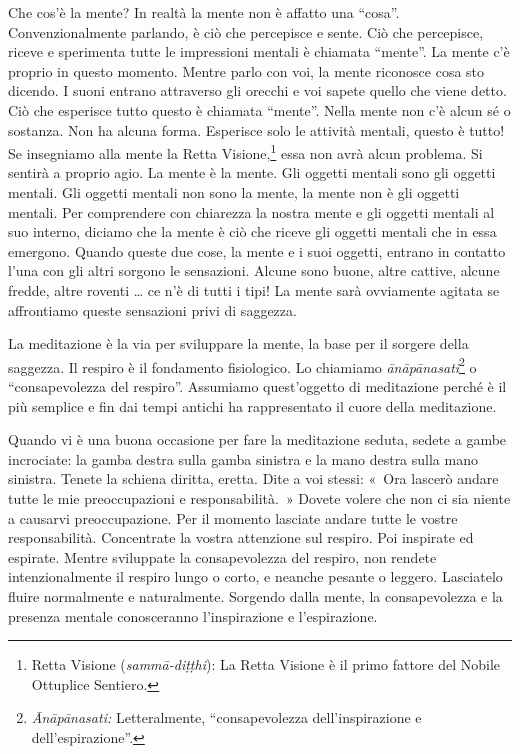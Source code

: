 Che cos'è la mente? In realtà la mente non è affatto una ``cosa''.
Convenzionalmente parlando, è ciò che percepisce e sente. Ciò che
percepisce, riceve e sperimenta tutte le impressioni mentali è chiamata
``mente''. La mente c'è proprio in questo momento. Mentre parlo con voi,
la mente riconosce cosa sto dicendo. I suoni entrano attraverso gli
orecchi e voi sapete quello che viene detto. Ciò che esperisce tutto
questo è chiamata ``mente''. Nella mente non c'è alcun sé o sostanza.
Non ha alcuna forma. Esperisce solo le attività mentali, questo è tutto!
Se insegniamo alla mente la Retta Visione,\footnote{Retta Visione
  (\emph{sammā-diṭṭhi}): La Retta Visione è il primo fattore del Nobile
  Ottuplice Sentiero.} essa non avrà alcun problema. Si sentirà a
proprio agio. La mente è la mente. Gli oggetti mentali sono gli oggetti
mentali. Gli oggetti mentali non sono la mente, la mente non è gli
oggetti mentali. Per comprendere con chiarezza la nostra mente e gli
oggetti mentali al suo interno, diciamo che la mente è ciò che riceve
gli oggetti mentali che in essa emergono. Quando queste due cose, la
mente e i suoi oggetti, entrano in contatto l'una con gli altri sorgono
le sensazioni. Alcune sono buone, altre cattive, alcune fredde, altre
roventi \ldots{} ce n'è di tutti i tipi! La mente sarà ovviamente agitata se
affrontiamo queste sensazioni privi di saggezza.

La meditazione è la via per sviluppare la mente, la base per il sorgere
della saggezza. Il respiro è il fondamento fisiologico. Lo chiamiamo
\emph{ānāpānasati}\footnote{\emph{Ānāpānasati:} Letteralmente,
  ``consapevolezza dell'inspirazione e dell'espirazione''.} o
``consapevolezza del respiro''. Assumiamo quest'oggetto di meditazione
perché è il più semplice e fin dai tempi antichi ha rappresentato il
cuore della meditazione.

Quando vi è una buona occasione per fare la meditazione seduta, sedete a
gambe incrociate: la gamba destra sulla gamba sinistra e la mano destra
sulla mano sinistra. Tenete la schiena diritta, eretta. Dite a voi
stessi: «~Ora lascerò andare tutte le mie preoccupazioni e
responsabilità.~» Dovete volere che non ci sia niente a causarvi
preoccupazione. Per il momento lasciate andare tutte le vostre
responsabilità. Concentrate la vostra attenzione sul respiro. Poi
inspirate ed espirate. Mentre sviluppate la consapevolezza del respiro,
non rendete intenzionalmente il respiro lungo o corto, e neanche pesante
o leggero. Lasciatelo fluire normalmente e naturalmente. Sorgendo dalla
mente, la consapevolezza e la presenza mentale conosceranno
l'inspirazione e l'espirazione.

